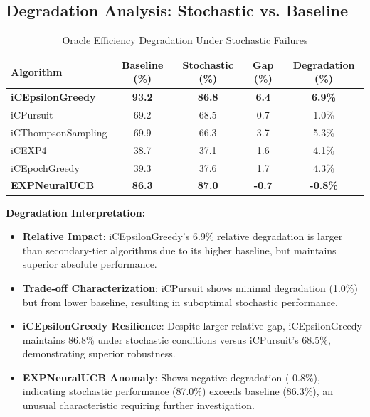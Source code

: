 \documentclass[12pt,a4paper]{article}
\newcommand{\primarytext}[1]{\textcolor{primaryblue}{\textbf{#1}}}
\newcommand{\secondarytext}[1]{\textcolor{secondaryblue}{\textbf{#1}}}
\newcommand{\success}[1]{\textcolor{accentgreen}{\textbf{#1}}}
\newcommand{\legacy}[1]{\textcolor{legacycolor}{\textbf{#1}}}
\begin{document}
\subsection{Degradation Analysis: Stochastic vs. Baseline}

\begin{table}[H]
\centering
\caption{Oracle Efficiency Degradation Under Stochastic Failures}
\label{tab:degradation-analysis}
\begin{tabular}{@{}lcccc@{}}
\toprule
\textbf{Algorithm} & \textbf{Baseline (\%)} & \textbf{Stochastic (\%)} & \textbf{Gap (\%)} & \textbf{Degradation (\%)} \\
\midrule
\primarytext{iCEpsilonGreedy}   & \primarytext{93.2} & \primarytext{86.8} & \primarytext{6.4} & \primarytext{6.9\%} \\
iCPursuit                       & 69.2 & 68.5 & 0.7 & 1.0\% \\
iCThompsonSampling              & 69.9 & 66.3 & 3.7 & 5.3\% \\
iCEXP4                          & 38.7 & 37.1 & 1.6 & 4.1\% \\
iCEpochGreedy                   & 39.3 & 37.6 & 1.7 & 4.3\% \\
\legacy{EXPNeuralUCB}           & \legacy{86.3} & \legacy{87.0} & \legacy{-0.7} & \legacy{-0.8\%} \\
\bottomrule
\end{tabular}
\end{table}

\textbf{Degradation Interpretation:}
\begin{itemize}
\item \primarytext{Relative Impact}: iCEpsilonGreedy's 6.9\% relative degradation is larger than secondary-tier algorithms due to its higher baseline, but maintains superior absolute performance.
\item \secondarytext{Trade-off Characterization}: iCPursuit shows minimal degradation (1.0\%) but from lower baseline, resulting in suboptimal stochastic performance.
\item \success{iCEpsilonGreedy Resilience}: Despite larger relative gap, iCEpsilonGreedy maintains 86.8\% under stochastic conditions versus iCPursuit's 68.5\%, demonstrating superior robustness.
\item \legacy{EXPNeuralUCB Anomaly}: Shows negative degradation (-0.8\%), indicating stochastic performance (87.0\%) exceeds baseline (86.3\%), an unusual characteristic requiring further investigation.
\end{itemize}
\end{document}
